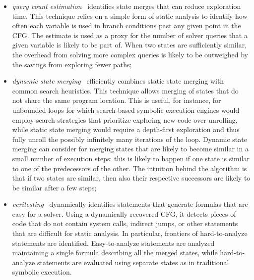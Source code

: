 \begin{itemize}

\item {\em query count estimation}~\cite{KKB-PLDI12} identifies state merges that can reduce exploration time. This technique relies on a simple form of static analysis to identify how often each variable is used in branch conditions past any given point in the CFG. The estimate is used as a proxy for the number of solver queries that a given variable is likely to be part of. When two states are sufficiently similar, the overhead from solving more complex queries is likely to be outweighed by the savings from exploring fewer paths;

  \item {\em dynamic state merging}~\cite{KKB-PLDI12} efficiently combines static state merging with common search heuristics. This technique allows merging of states that do not share the same program location. This is useful, for instance, for unbounded loops for which search-based symbolic execution engines would employ search strategies that prioritize exploring new code over unrolling, while static state merging would require a depth-first exploration and thus fully unroll the possibly infinitely many iterations of the loop. Dynamic state merging can consider for merging states that are likely to become similar in a small number of execution steps: this is likely to happen if one state is similar to one of the predecessors of the other. The intuition behind the algorithm is that if two states are similar, then also their respective successors are likely to be similar after a few steps;

  \item {\em veritesting}~\cite{VERITESTING-ICSE14} dynamically identifies statements that generate formulas that are easy for a solver. Using a dynamically recovered CFG, it detects pieces of code that do not contain system calls, indirect jumps, or other statements that are difficult for static analysis. In particular, frontiers of hard-to-analyze statements are identified. Easy-to-analyze statements are analyzed maintaining a single formula describing all the merged states, while hard-to-analyze statements are evaluated using separate states as in traditional symbolic execution.

\end{itemize}

